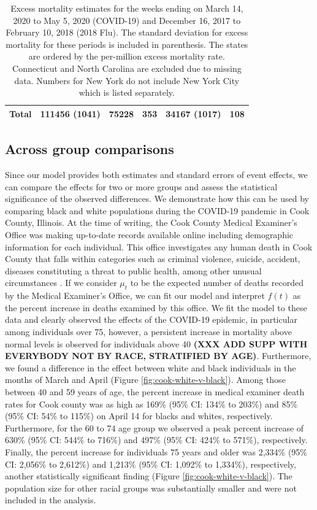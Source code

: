 \documentclass[11pt]{article}
\begin{document}
\begin{table}
\begin{tabular}{|l|lll|ll|}
 \hline
  Total & 111456 (1041) & 75228 & 353 & 34167 (1017) & 108 \\ 
  \hline
 \end{tabular}
 \caption{Excess mortality estimates for the weeks ending on March 14, 2020 to May 5, 2020 (COVID-19) and  December 16, 2017 to February 10, 2018 (2018 Flu). The standard deviation for excess mortality for these periods is included in parenthesis. The states are ordered by the per-million excess mortality rate. Connecticut and North Carolina are excluded due to missing data. Numbers for New York do not include New York City which is listed separately.}
 \label{tab:covid19-states}
 \normalsize
\end{table}
 
 

\subsection{Across group comparisons}
\label{subsec:group-comparison}
Since our model provides both estimates and standard errors of event effects, we can compare the effects for two or more groups and assess the statistical significance of the observed differences. We demonstrate how this can be used by comparing black and white populations during the COVID-19 pandemic in Cook County, Illinois. At the time of writing, the Cook County Medical Examiner's Office was making up-to-date records available online including demographic information for each individual. This office investigates any human death in Cook County that falls within categories such as criminal violence, suicide, accident, diseases constituting a threat to public health, among other unusual circumstances \cite{cookcovid19}. If we consider $\mu_t$ to be the expected number of deaths recorded by the Medical Examiner's Office, we can fit our model and interpret $f(t)$ as the percent increase in deaths examined by this office. We fit the model to these data and clearly observed the effects of the COVID-19 epidemic, in particular among individuals over 75,  however, a persistent increase in mortality above normal levels is observed for individuals above 40 \textbf{(XXX ADD SUPP WITH EVERYBODY NOT BY RACE, STRATIFIED BY AGE)}.  Furthermore, we found a difference in the effect  between white and black individuals in the months of March and April (Figure \ref{fig:cook-white-v-black}). Among those between 40 and 59 years of age, the percent increase in medical examiner death rates for Cook county was as high as 169\% (95\% CI: 134\% to 203\%) and 85\%  (95\% CI: 54\% to 115\%) on April 14 for blacks and whites, respectively. Furthermore, for the 60 to 74 age group we observed a peak percent increase of 630\% (95\% CI: 544\% to 716\%) and 497\% (95\% CI: 424\% to 571\%), respectively. Finally, the percent increase for individuals 75 years and older was 2,334\% (95\% CI: 2,056\% to 2,612\%) and 1,213\% (95\% CI: 1,092\% to 1,334\%), respectively, another statistically significant finding (Figure \ref{fig:cook-white-v-black}).  The population size for other racial groups was substantially smaller and were not included in the analysis.
\end{document}
